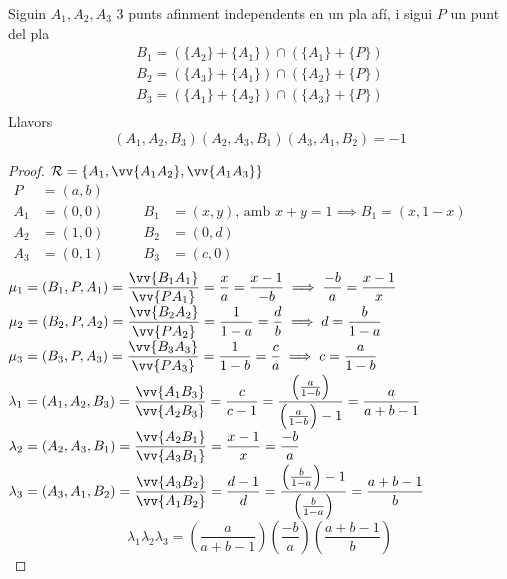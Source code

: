 \begin{thm}[de Ceva]
	Siguin $A_1,A_2,A_3$ 3 punts afinment independents en un pla afí, i sigui $P$ un punt del pla
	\[\begin{array}{l}
		B_1=(\{A_2\}+\{A_1\})\cap (\{A_1\}+\{P\}) \\
		B_2=(\{A_3\}+\{A_1\})\cap (\{A_2\}+\{P\}) \\
		B_3=(\{A_1\}+\{A_2\})\cap (\{A_3\}+\{P\}) \\
	\end{array}\]
	Llavors
	\[(A_1,A_2,B_3)(A_2,A_3,B_1)(A_3,A_1,B_2)=-1\]
\end{thm}
\begin{proof}
	$\mathcal{R}=\{A_1,\vv{A_1A_2},\vv{A_1A_3}\}$ \bigskip \\ 
	$\begin{array}{rlrl}
		P   & =(a,b)\hspace{2em} & & \\
		A_1 & =(0,0)\hspace{2em} & B_1 & =(x,y)\text{, amb }x+y=1\implies B_1=(x,1-x) \\
		A_2 & =(1,0)\hspace{2em} & B_2 & =(0,d) \\
		A_3 & =(0,1)\hspace{2em} & B_3 & =(c,0) \\
	\end{array}$ \bigskip  \\
	$\displaystyle{\mu_1=(B_1,P,A_1)=\frac{\vv{B_1A_1}}{\vv{PA_1}}=\frac{x}{a}=\frac{x-1}{-b}\implies\frac{-b}{a}=\frac{x-1}{x}}$ \\
	$\displaystyle{\mu_2=(B_2,P,A_2)=\frac{\vv{B_2A_2}}{\vv{PA_2}}=\frac{1}{1-a}=\frac{d}{b}\implies d=\frac{b}{1-a}}$ \\
	$\displaystyle{\mu_3=(B_3,P,A_3)=\frac{\vv{B_3A_3}}{\vv{PA_3}}=\frac{1}{1-b}=\frac{c}{a}\implies c=\frac{a}{1-b}}$ \bigskip \\
	$\displaystyle{\lambda_1=(A_1,A_2,B_3)=\frac{\vv{A_1B_3}}{\vv{A_2B_3}}=\frac{c}{c-1}=\frac{\left(\frac{a}{1-b}\right)}{\left(\frac{a}{1-b}\right)-1}=\frac{a}{a+b-1}}$ \\
	$\displaystyle{\lambda_2=(A_2,A_3,B_1)=\frac{\vv{A_2B_1}}{\vv{A_3B_1}}=\frac{x-1}{x}=\frac{-b}{a}}$ \\
	$\displaystyle{\lambda_3=(A_3,A_1,B_2)=\frac{\vv{A_3B_2}}{\vv{A_1B_2}}=\frac{d-1}{d}=\frac{\left(\frac{b}{1-a}\right)-1}{\left(\frac{b}{1-a}\right)}=\frac{a+b-1}{b}}$ \bigskip \\
	\[\lambda_1\lambda_2\lambda_3=\left(\frac{a}{a+b-1}\right)\left(\frac{-b}{a}\right)\left(\frac{a+b-1}{b}\right)\]
\end{proof}

